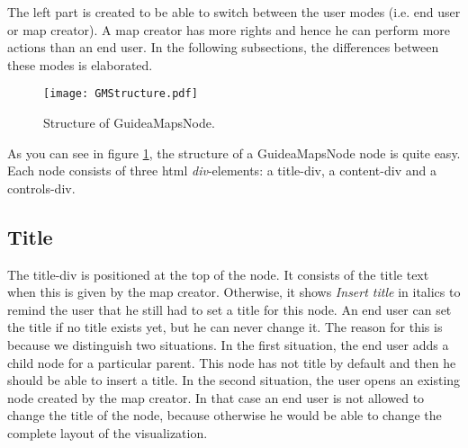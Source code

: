 The left part is created to be able to switch between the user modes (i.e. end user or map creator). A map creator has more rights and hence he can perform more actions than an end user. In the following subsections, the differences between these modes is elaborated.

\begin{figure}[H]
	\centering
	\texttt{[image: GMStructure.pdf]}
	\caption{Structure of GuideaMapsNode.}
	\label{fig:gmnodestructure}
\end{figure}

As you can see in figure \ref{fig:gmnodestructure}, the structure of a GuideaMapsNode node is quite easy. Each node consists of three html \textit{div}-elements: a title-div, a content-div and a controls-div.

\subsection{Title}
The title-div is positioned at the top of the node. It consists of the title text when this is given by the map creator. Otherwise, it shows \textit{Insert title} in italics to remind the user that he still had to set a title for this node. An end user can set the title if no title exists yet, but he can never change it. The reason for this is because we distinguish two situations. In the first situation, the end user adds a child node for a particular parent. This node has not title by default and then he should be able to insert a title. In the second situation, the user opens an existing node created by the map creator. In that case an end user is not allowed to change the title of the node, because otherwise he would be able to change the complete layout of the visualization. \\

